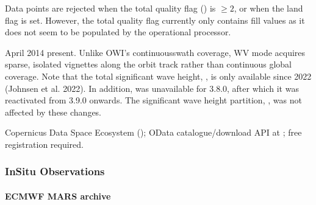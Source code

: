 \documentclass[a4paper,10pt,english]{sphinxmanual}
\begin{document}
\sphinxAtStartPar
Data points are rejected when the total quality flag () is \(\geq 2\), or when the land flag is set. However, the total quality flag currently only contains fill values as it does not seem to be populated by the operational processor.

\sphinxAtStartPar
{}

 April 2014 \textendash{} present. Unlike OWI’s continuous\sphinxhyphen{}swath coverage, WV mode acquires sparse, isolated vignettes along the orbit track rather than continuous global coverage. Note that the total significant wave height, , is only available since 2022 (Johnsen et al. 2022). In addition,  was unavailable for  3.8.0, after which it was reactivated from  3.9.0 onwards. The significant wave height partition, , was not affected by these changes.

\sphinxAtStartPar
{}

\sphinxAtStartPar
Copernicus Data Space Ecosystem (); OData catalogue/download API at ; free registration required.


\subsubsection{In\sphinxhyphen{}Situ Observations}
\label{\detokenize{05_reference_datasets:in-situ-observations-1}}\label{\detokenize{05_reference_datasets:id2}}

\paragraph{ECMWF MARS archive}
\label{\detokenize{05_reference_datasets:ecmwf-mars-archive-1}}\label{\detokenize{05_reference_datasets:id3}}
\sphinxAtStartPar
{}

\sphinxAtStartPar
{}

\sphinxAtStartPar
{}

\sphinxAtStartPar
{}

\sphinxAtStartPar
{}
\end{document}
